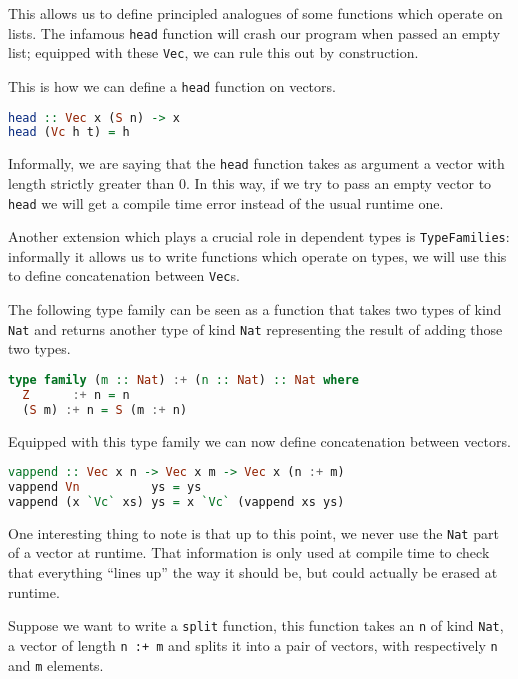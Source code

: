 \documentclass[11pt]{article}
\begin{document}
This allows us to define principled analogues of some functions which
operate on lists. The infamous \texttt{head} function will
crash our program when passed an empty list; equipped with these \texttt{Vec}, we can rule this
out by construction. 

This is how we can define a \texttt{head} function on vectors.

\begin{lstlisting}[language=haskell]
head :: Vec x (S n) -> x
head (Vc h t) = h
\end{lstlisting}

Informally, we are saying that the \texttt{head} function takes as
argument a vector with length strictly greater than 0. In this way, if we
try to pass an empty vector to \texttt{head} we will get a compile time
error instead of the usual runtime one.

Another extension which plays a crucial role in dependent types is
\texttt{TypeFamilies}: informally it allows us to write functions which operate on types, 
we will use this to define concatenation between \texttt{Vec}s.

The following type family can be seen as a function that takes two types
of kind \texttt{Nat} and returns another type of kind \texttt{Nat}
representing the result of adding those two types.

\begin{lstlisting}[language=haskell]
type family (m :: Nat) :+ (n :: Nat) :: Nat where
  Z      :+ n = n
  (S m) :+ n = S (m :+ n)
\end{lstlisting}

Equipped with this type family we can now define concatenation between
vectors.

\begin{lstlisting}[language=haskell]
vappend :: Vec x n -> Vec x m -> Vec x (n :+ m)
vappend Vn          ys = ys
vappend (x `Vc` xs) ys = x `Vc` (vappend xs ys)
\end{lstlisting}

One interesting thing to note is that up to this point, we never use the
\texttt{Nat} part of a vector at runtime. That information is only used
at compile time to check that everything ``lines up'' the way it should
be, but could actually be erased at runtime.

Suppose we want to write a \texttt{split} function, this function takes
an \texttt{n} of kind \texttt{Nat}, a vector of length \texttt{n\ :+\ m}
and splits it into a pair of vectors, with respectively \texttt{n} and
\texttt{m} elements.
\end{document}
